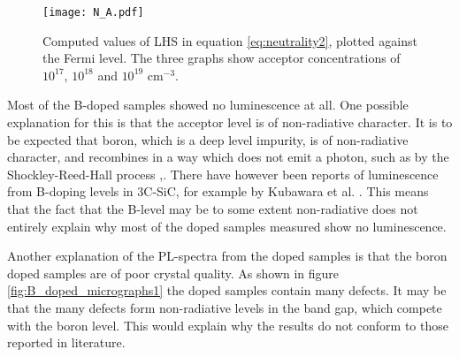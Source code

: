 \begin{figure}[H]
\begin{center}
\texttt{[image: N\_A.pdf]}
\caption{Computed values of LHS in equation \ref{eq:neutrality2}, plotted against the Fermi level. The three graphs show acceptor concentrations of $10^{17}$, $10^{18}$ and $10^{19}$ cm$^{-3}$. 
\label{fig:N_A}}
\end{center}
\end{figure}

Most of the B-doped samples showed no luminescence at all. One possible explanation for this is that the acceptor level is of non-radiative character. It is to be expected that boron, which is a deep level impurity, is of non-radiative character, and recombines in a way which does not emit a photon, such as by the Shockley-Reed-Hall process \cite{Hall1952},\cite{Shockley1952}. There have however been reports of luminescence from B-doping levels in 3C-SiC, for example by Kubawara  et al. \cite{Company1976}. This means that the fact that the B-level may be to some extent non-radiative does not entirely explain why most of the doped samples measured show no luminescence. 

Another explanation of the PL-spectra from the doped samples is that the boron doped samples are of poor crystal quality. As shown in figure \ref{fig:B_doped_micrographs1} the doped samples contain many defects. It may be that the many defects form non-radiative levels in the band gap, which compete with the boron level. This would explain why the results do not conform to those reported in literature. 

